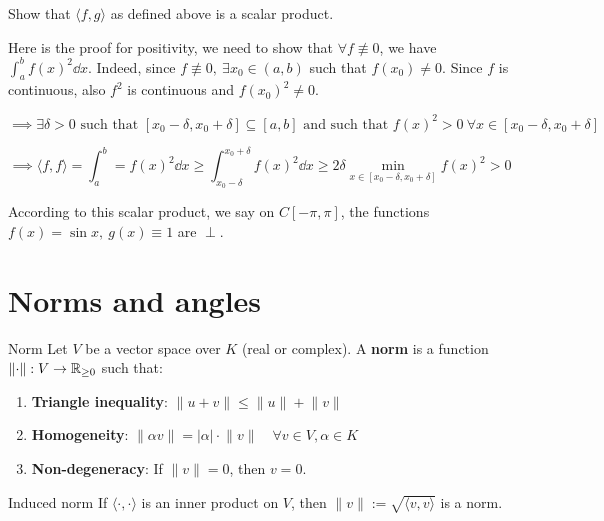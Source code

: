 \documentclass[12pt]{article}
\begin{document}
\begin{exercise}{}{}
    Show that $\langle f, g \rangle$ as defined above is a scalar product. 
    
     Here is the proof for positivity, we need to show that $\forall f \not\equiv 0$, we have $\int_{a}^{b} f(x)^2 \dd x$. Indeed, since $f \not\equiv 0,\ \exists x_0 \in (a, b)$ such that $f(x_0) \neq 0$. Since $f$ is continuous, also $f^2$ is continuous and $f(x_0)^2 \neq 0$. 
    
    $$
        \implies \exists \delta > 0 \text{ such that } [x_0 - \delta, x_0 + \delta] \subseteq [a, b] \text{ and such that } f(x)^2 > 0 \ \forall x \in [x_0 - \delta, x_0 + \delta]
    $$

    $$
        \implies \langle f, f \rangle = \int_{a}^{b} = f(x)^2 \dd x \geq \int_{x_0 - \delta}^{x_0 + \delta} f(x)^2 \dd x \geq 2 \delta \min\limits_{x \in [x_0 - \delta, x_0 + \delta]}f(x)^2 > 0
    $$

    According to this scalar product, we say on $C[-\pi, \pi]$, the functions $f(x) = \sin x,\ g(x) \equiv 1$ are $\perp$.
\end{exercise}

\section{Norms and angles}

\begin{definition}{Norm}{}
    Let $V$ be a vector space over $K$ (real or complex). A \textbf{norm} is a function $\lVert \cdot \rVert: V \rightarrow \mathbb{R}_{\geq 0}$ such that:
    \begin{enumerate}
        \item \textbf{Triangle inequality}: $\lVert u + v \rVert \leq \lVert u \rVert + \lVert v \rVert$
        \item \textbf{Homogeneity}: $\lVert \alpha v \rVert = |\alpha| \cdot \lVert v \rVert \quad \forall v \in V, \alpha \in K$
        \item \textbf{Non-degeneracy}: If $\lVert v \rVert = 0$, then $v = 0$.
    \end{enumerate}
\end{definition}

\begin{remark}{Induced norm}{}
    If $\langle \cdot, \cdot \rangle$ is an inner product on $V$, then $\lVert v \rVert := \sqrt{\langle v, v \rangle}$ is a norm.
\end{remark}
\end{document}
